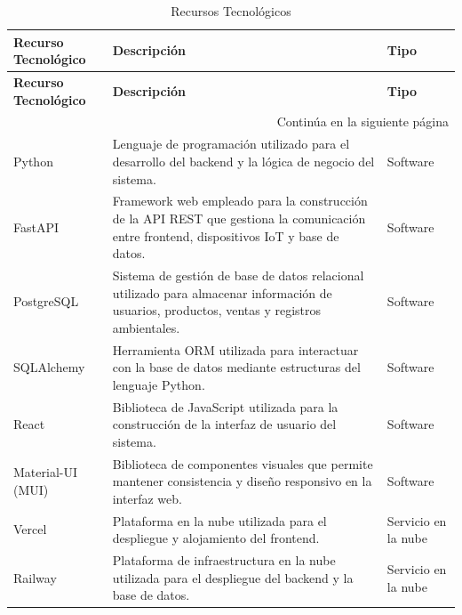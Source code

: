 \begin{longtable}{|p{3.5cm}|p{8cm}|p{2.5cm}|}

\caption{Recursos Tecnológicos} \label{tab:recursos_tecnologicos} \\

\hline
\rowcolor{gray!20}
\textbf{Recurso Tecnológico} & \textbf{Descripción} & \textbf{Tipo} \\
\hline
\endfirsthead

\hline
\rowcolor{gray!20}
\textbf{Recurso Tecnológico} & \textbf{Descripción} & \textbf{Tipo} \\
\hline
\endhead

\hline
\multicolumn{3}{|r|}{\small Continúa en la siguiente página} \\
\hline
\endfoot

\hline
\endlastfoot

Python & Lenguaje de programación utilizado para el desarrollo del backend y la lógica de negocio del sistema. & Software \\
\hline

FastAPI & Framework web empleado para la construcción de la API REST que gestiona la comunicación entre frontend, dispositivos IoT y base de datos. & Software \\
\hline

PostgreSQL & Sistema de gestión de base de datos relacional utilizado para almacenar información de usuarios, productos, ventas y registros ambientales. & Software \\
\hline

SQLAlchemy & Herramienta ORM utilizada para interactuar con la base de datos mediante estructuras del lenguaje Python. & Software \\
\hline

React & Biblioteca de JavaScript utilizada para la construcción de la interfaz de usuario del sistema. & Software \\
\hline

Material-UI (MUI) & Biblioteca de componentes visuales que permite mantener consistencia y diseño responsivo en la interfaz web. & Software \\
\hline

Vercel & Plataforma en la nube utilizada para el despliegue y alojamiento del frontend. & Servicio en la nube \\
\hline

Railway & Plataforma de infraestructura en la nube utilizada para el despliegue del backend y la base de datos. & Servicio en la nube \\
\hline


\end{longtable}
